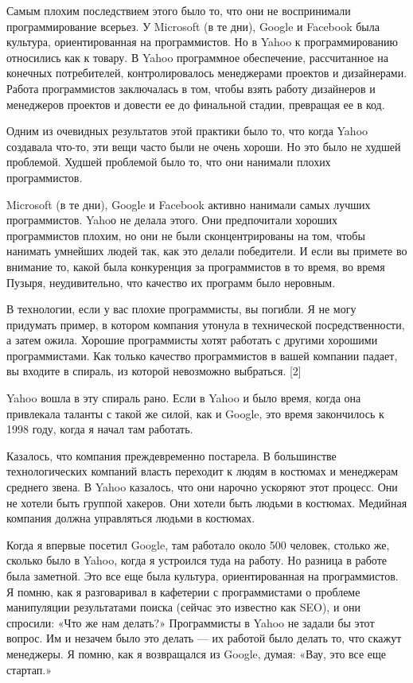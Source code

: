 \documentclass[ebook,12pt,oneside,openany]{memoir}
\begin{document}
Самым плохим последствием этого было то, что они не воспринимали
программирование всерьез. У Microsoft (в те дни), Google и Facebook
была культура, ориентированная на программистов. Но в Yahoo к
программированию относились как к товару. В Yahoo программное
обеспечение, рассчитанное на конечных потребителей, контролировалось
менеджерами проектов и дизайнерами. Работа программистов заключалась в
том, чтобы взять работу дизайнеров и менеджеров проектов и довести ее
до финальной стадии, превращая ее в код.

Одним из очевидных результатов этой практики было то, что когда Yahoo
создавала что-то, эти вещи часто были не очень хороши. Но это было не
худшей проблемой. Худшей проблемой было то, что они нанимали плохих
программистов.

Microsoft (в те дни), Google и Facebook активно нанимали самых лучших
программистов. Yahoо не делала этого. Они предпочитали хороших
программистов плохим, но они не были сконцентрированы на том, чтобы
нанимать умнейших людей так, как это делали победители. И если вы
примете во внимание то, какой была конкуренция за программистов в то
время, во время Пузыря, неудивительно, что качество их программ было
неровным.

В технологии, если у вас плохие программисты, вы погибли. Я не могу
придумать пример, в котором компания утонула в технической
посредственности, а затем ожила. Хорошие программисты хотят работать с
другими хорошими программистами. Как только качество программистов в
вашей компании падает, вы входите в спираль, из которой невозможно
выбраться. [2]

Yahoo вошла в эту спираль рано. Если в Yahoo и было время, когда она
привлекала таланты с такой же силой, как и Google, это время
закончилось к 1998 году, когда я начал там работать.

Казалось, что компания преждевременно постарела. В большинстве
технологических компаний власть переходит к людям в костюмах и
менеджерам среднего звена. В Yahoo казалось, что они нарочно ускоряют
этот процесс. Они не хотели быть группой хакеров. Они хотели быть
людьми в костюмах. Медийная компания должна управляться людьми в
костюмах.

Когда я впервые посетил Google, там работало около 500 человек,
столько же, сколько было в Yahoo, когда я устроился туда на работу. Но
разница в работе была заметной. Это все еще была культура,
ориентированная на программистов. Я помню, как я разговаривал в
кафетерии с программистами о проблеме манипуляции результатами поиска
(сейчас это известно как SEO), и они спросили: «Что же нам делать?»
Программисты в Yahoo не задали бы этот вопрос. Им и незачем было это
делать — их работой было делать то, что скажут менеджеры. Я помню, как
я возвращался из Google, думая: «Вау, это все еще стартап.»
\end{document}
